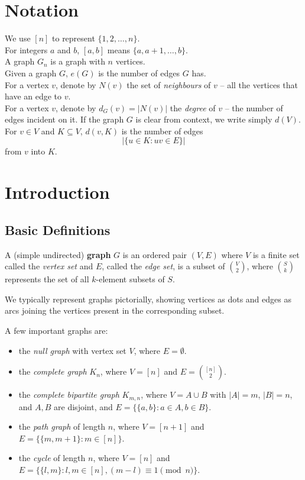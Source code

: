 \documentclass{article}
\begin{document}
\thispagestyle{empty}

\titleBC
\tableofcontents
\clearpage

\setcounter{section}{-1}

\section{Notation}
	
	We use $[n]$ to represent $\{1,2,\ldots,n\}$.\\
	For integers $a$ and $b$, $[a,b]$ means $\{a,a+1,\ldots,b\}$.\\
	A graph $G_n$ is a graph with $n$ vertices.\\
	Given a graph $G$, $e(G)$ is the number of edges $G$ has.\\
	For a vertex $v$, denote by $N(v)$ the set of \emph{neighbours} of $v$ -- all the vertices that have an edge to $v$.\\
	For a vertex $v$, denote by $d_G(v) = |N(v)|$ the \emph{degree} of $v$ -- the number of edges incident on it. If the graph $G$ is clear from context, we write simply $d(V)$. \\
	For $v \in V$ and $K \subseteq V$, $d(v,K)$ is the number of edges
	\[ \left|\{ u \in K : uv \in E \}\right| \]
	from $v$ into $K$.

\section{Introduction}

	\subsection{Basic Definitions}

		\begin{fdef}
			A (simple undirected) \textbf{graph} $G$ is an ordered pair $(V,E)$ where $V$ is a finite set called the \emph{vertex set} and $E$, called the \emph{edge set}, is a subset of $\binom{V}{2}$, where $\binom{S}{k}$ represents the set of all $k$-element subsets of $S$.
		\end{fdef}

		We typically represent graphs pictorially, showing vertices as dots and edges as arcs joining the vertices present in the corresponding subset.

		A few important graphs are:
		\begin{itemize}
			\item the \emph{null graph} with vertex set $V$, where $E = \emptyset$.
			\item the \emph{complete graph} $K_n$, where $V = [n]$ and $E = \binom{[n]}{2}$.
			\item the \emph{complete bipartite graph} $K_{m,n}$, where $V = A \cup B$ with $|A|=m$, $|B|=n$, and $A,B$ are disjoint, and $E = \{\{a,b\} : a \in A, b \in B\}$.
			\item the \emph{path graph} of length $n$, where $V = [n+1]$ and $E = \{\{m,m+1\} : m \in [n]\}$.
			\item the \emph{cycle} of length $n$, where $V = [n]$ and $E = \{\{l,m\} : l,m\in [n] , (m - l) \equiv 1 \pmod{n}\}$.
		\end{itemize}
\end{document}
